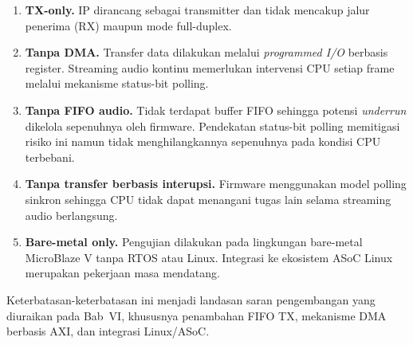 \begin{enumerate}
	\item \textbf{TX-only.} IP dirancang sebagai transmitter dan tidak mencakup jalur penerima (RX) maupun mode full-duplex.
	
	\item \textbf{Tanpa DMA.} Transfer data dilakukan melalui \textit{programmed I/O} berbasis register. Streaming audio kontinu memerlukan intervensi CPU setiap frame melalui mekanisme status-bit polling.
	
	\item \textbf{Tanpa FIFO audio.} Tidak terdapat buffer FIFO sehingga potensi \textit{underrun} dikelola sepenuhnya oleh firmware. Pendekatan status-bit polling memitigasi risiko ini namun tidak menghilangkannya sepenuhnya pada kondisi CPU terbebani.
	
	\item \textbf{Tanpa transfer berbasis interupsi.} Firmware menggunakan model polling sinkron sehingga CPU tidak dapat menangani tugas lain selama streaming audio berlangsung.
	
	\item \textbf{Bare-metal only.} Pengujian dilakukan pada lingkungan bare-metal MicroBlaze V tanpa RTOS atau Linux. Integrasi ke ekosistem ASoC Linux merupakan pekerjaan masa mendatang.
\end{enumerate}

Keterbatasan-keterbatasan ini menjadi landasan saran pengembangan yang diuraikan pada Bab~VI, khususnya penambahan FIFO TX, mekanisme DMA berbasis AXI, dan integrasi Linux/ASoC.
